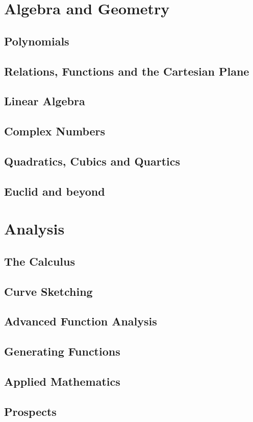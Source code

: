 \documentclass{scrbook}
\begin{document}
\part{Algebra and Geometry}

\chapter{Polynomials} %

\chapter{Relations, Functions and the Cartesian Plane} %

\chapter{Linear Algebra} %

\chapter{Complex Numbers} %

\chapter{Quadratics, Cubics and Quartics} %

\chapter{Euclid and beyond} %

\part{Analysis}

\chapter{The Calculus} %

\chapter{Curve Sketching} %
\chapter{Advanced Function Analysis} %
\chapter{Generating Functions} %
\chapter{Applied Mathematics} %
\chapter{Prospects} %
\end{document}
